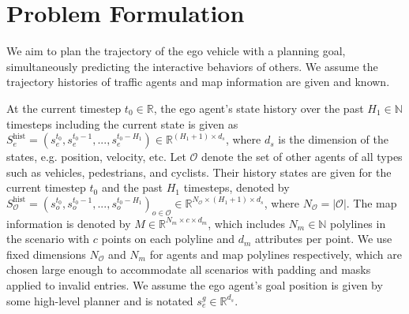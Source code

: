 \section{Problem Formulation} \label{sec: problem formulation}

We aim to plan the trajectory of the ego vehicle with a planning goal, simultaneously predicting the interactive behaviors of others. We assume 
the trajectory histories of traffic agents and map information are given and known.

At the current timestep $t_0 \in \mathbb{R}$, the ego agent's state history over the past $H_1 \in \mathbb{N}$ timesteps including the current state 
is given as $S_e^{\text{hist}} = (s_e^{t_0}, s_e^{t_0-1}, ..., s_e^{t_0-H_1}) \in \mathbb{R}^{(H_1 + 1) \times d_s}$, where $d_s$ is the dimension of the states, e.g. position, velocity, etc.
Let $\mathcal{O}$ denote the set of 
other agents of all types such as
vehicles, pedestrians, and cyclists.
Their history states are given for the current timestep $t_0$ and the past $H_1$ timesteps, denoted by $S_{\mathcal{O}}^{\text{hist}} = (s_{o}^{t_0}, s_{o}^{t_0-1}, ..., s_{o}^{t_0-H_1})_{o \in \mathcal{O}} \in \mathbb{R}^{N_{\mathcal{O}} \times (H_1 + 1) \times d_s}$, where $N_{\mathcal{O}} = |\mathcal{O}|$.
The map information is denoted by $M \in \mathbb{R}^{N_m \times c \times d_m}$, which includes $N_m \in \mathbb{N}$ polylines in the scenario with $c$ points on each polyline and $d_m$ attributes per point.
We use fixed dimensions $N_{\mathcal{O}}$ and $N_m$ for agents and map polylines respectively, which are chosen large enough to accommodate all scenarios with padding and masks applied to invalid entries.
We assume the ego agent's goal position is given by some high-level planner and is notated $s_e^g \in \mathbb{R}^{d_s}$.

